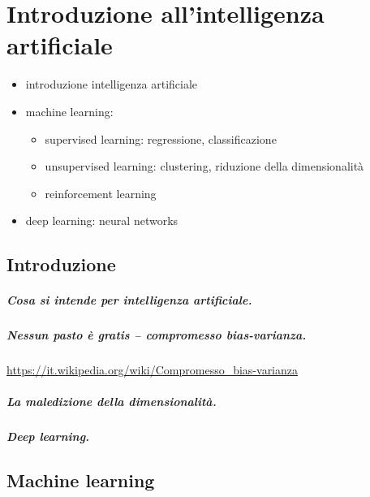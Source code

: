 \chapter{Introduzione all'intelligenza artificiale}
\begin{itemize}
  \item introduzione intelligenza artificiale
  \item machine learning:
  \begin{itemize}
    \item supervised learning: regressione, classificazione
    \item unsupervised learning: clustering, riduzione della dimensionalità
    \item reinforcement learning
  \end{itemize}
  \item deep learning: neural networks
\end{itemize}

\section{Introduzione}
\paragraph{Cosa si intende per intelligenza artificiale.}
\paragraph{Nessun pasto è gratis -- compromesso bias-varianza.}
\href{https://it.wikipedia.org/wiki/Compromesso\_bias-varianza}{https://it.wikipedia.org/wiki/Compromesso\_bias-varianza}
\paragraph{La maledizione della dimensionalità.}
\paragraph{Deep learning.}

\section{Machine learning}


